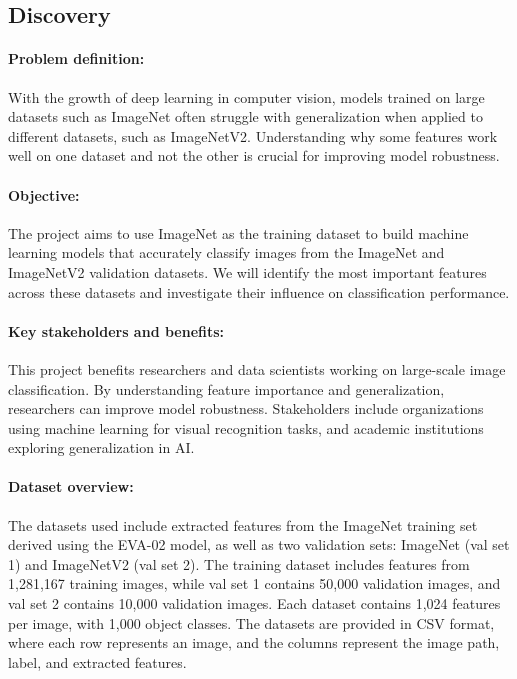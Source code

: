 \documentclass[a4paper,11pt]{article}
\begin{document}
\subsection{Discovery}
\paragraph{Problem definition:}  
With the growth of deep learning in computer vision, models trained on large datasets such as ImageNet often struggle with generalization when applied to different datasets, such as ImageNetV2. Understanding why some features work well on one dataset and not the other is crucial for improving model robustness.

\paragraph{Objective:}  
The project aims to use ImageNet as the training dataset to build machine learning models that accurately classify images from the ImageNet and ImageNetV2 validation datasets. We will identify the most important features across these datasets and investigate their influence on classification performance.

\paragraph{Key stakeholders and benefits:}  
This project benefits researchers and data scientists working on large-scale image classification. By understanding feature importance and generalization, researchers can improve model robustness. Stakeholders include organizations using machine learning for visual recognition tasks, and academic institutions exploring generalization in AI.

\paragraph{Dataset overview:}
The datasets used include extracted features from the ImageNet training set derived using the EVA-02 model, as well as two validation sets: ImageNet (val set 1) and ImageNetV2 (val set 2). The training dataset includes features from 1,281,167 training images, while val set 1 contains 50,000 validation images, and val set 2 contains 10,000 validation images. Each dataset contains 1,024 features per image, with 1,000 object classes. The datasets are provided in CSV format, where each row represents an image, and the columns represent the image path, label, and extracted features.
\end{document}
